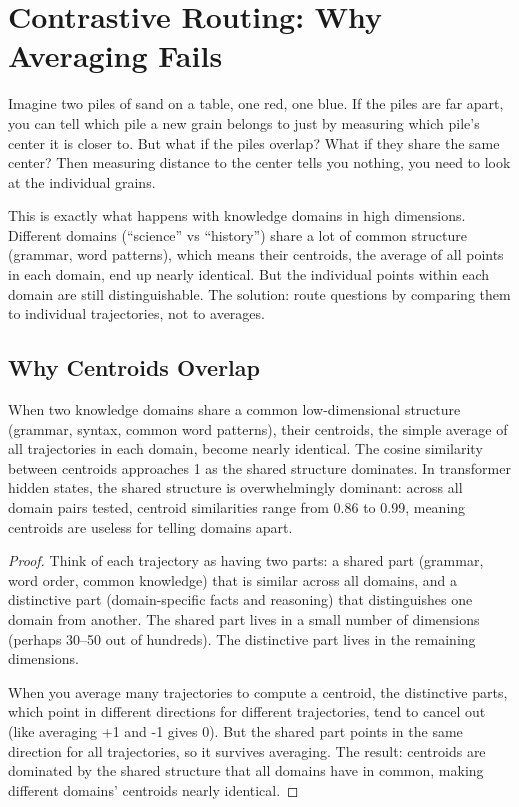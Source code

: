 \documentclass[11pt]{article}
\begin{document}
\section{Contrastive Routing: Why Averaging Fails}

Imagine two piles of sand on a table, one red, one blue. If the piles are
far apart, you can tell which pile a new grain belongs to just by measuring
which pile's center it is closer to. But what if the piles overlap? What if
they share the same center? Then measuring distance to the center tells you
nothing, you need to look at the individual grains.

This is exactly what happens with knowledge domains in high dimensions.
Different domains (``science'' vs ``history'') share a lot of common structure
(grammar, word patterns), which means their centroids, the average
of all points in each domain, end up nearly identical. But the individual
points within each domain are still distinguishable. The solution: route
questions by comparing them to individual trajectories, not to averages.

\subsection{Why Centroids Overlap}

\begin{theorem}\label{thm:centroid_entanglement}
When two knowledge domains share a common low-dimensional structure (grammar,
syntax, common word patterns), their centroids, the simple average of all
trajectories in each domain, become nearly identical. The cosine similarity
between centroids approaches 1 as the shared structure dominates. In
transformer hidden states, the shared structure is overwhelmingly dominant:
across all domain pairs tested, centroid similarities range from 0.86 to
0.99, meaning centroids are useless for telling domains apart.
\end{theorem}
\begin{proof}
Think of each trajectory as having two parts: a shared part (grammar,
word order, common knowledge) that is similar across all domains, and a
distinctive part (domain-specific facts and reasoning) that
distinguishes one domain from another. The shared part lives in a small
number of dimensions (perhaps 30--50 out of hundreds). The distinctive part
lives in the remaining dimensions.

When you average many trajectories to compute a centroid, the distinctive
parts, which point in different directions for different trajectories, tend
to cancel out (like averaging +1 and -1 gives 0). But the shared part points
in the same direction for all trajectories, so it survives averaging. The
result: centroids are dominated by the shared structure that all domains
have in common, making different domains' centroids nearly identical.
\end{proof}
\end{document}
